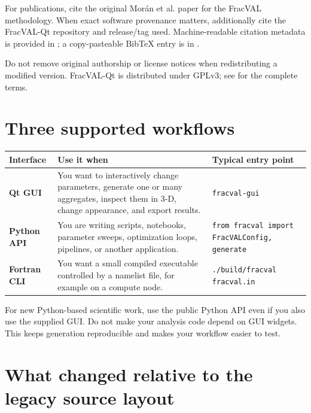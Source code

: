\documentclass[11pt,oneside]{report}
\newcommand{\code}[1]{\texttt{#1}}
\begin{document}
For publications, cite the original Morán et al. paper for the FracVAL
methodology. When exact software provenance matters, additionally cite the
FracVAL-Qt repository and release/tag used. Machine-readable citation metadata
is provided in ; a copy-pasteable BibTeX entry is in
.

\begin{importantbox}
Do not remove original authorship or license notices when redistributing a
modified version. FracVAL-Qt is distributed under GPLv3; see  for
the complete terms.
\end{importantbox}

\section{Three supported workflows}

\begin{longtable}{>{\bfseries}p{}p{}p{}}
\toprule
Interface & Use it when & Typical entry point \\
\midrule
Qt GUI & You want to interactively change parameters, generate one or many aggregates, inspect them in 3-D, change appearance, and export results. & \code{fracval-gui} \\
Python API & You are writing scripts, notebooks, parameter sweeps, optimization loops, pipelines, or another application. & \code{from fracval import FracVALConfig, generate} \\
Fortran CLI & You want a small compiled executable controlled by a namelist file, for example on a compute node. & \code{./build/fracval fracval.in} \\
\bottomrule
\end{longtable}

\begin{tipbox}
For new Python-based scientific work, use the public Python API even if you also
use the supplied GUI. Do not make your analysis code depend on GUI widgets.
This keeps generation reproducible and makes your workflow easier to test.
\end{tipbox}

\section{What changed relative to the legacy source layout}
\end{document}
